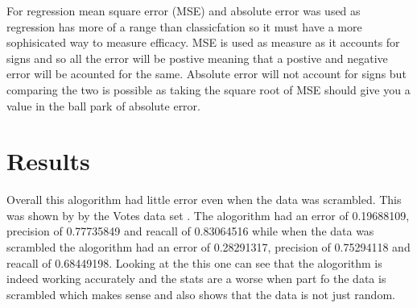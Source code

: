\documentclass[twoside,11pt]{article}
\begin{document}
For regression mean square error (MSE) and absolute error was used as regression has more of a range than classicfation so it must 
have a more sophisicated way to measure efficacy. MSE is used as measure as it accounts for signs and so all the error will be postive
meaning that a postive and negative error will be acounted for the same. Absolute error will not account for signs but comparing the two
is possible as taking the square root of MSE should give you a value in the ball park of absolute error. 



\section{Results}
Overall this  alogorithm had little error even when the data was scrambled.  
This was shown by by the Votes data set \citep{Vote}. The alogorithm had an error of 0.19688109, precision of 0.77735849
and reacall of 0.83064516 while when the data was scrambled the alogorithm had an error of 0.28291317, precision 
of 0.75294118 and reacall of 0.68449198.  Looking at the this one can see that the alogorithm is indeed working accurately
and the stats are a worse when part fo the data is scrambled which makes sense and also shows that the data is not just 
random. 




\newpage





\vskip 0.2in

\end{document}
